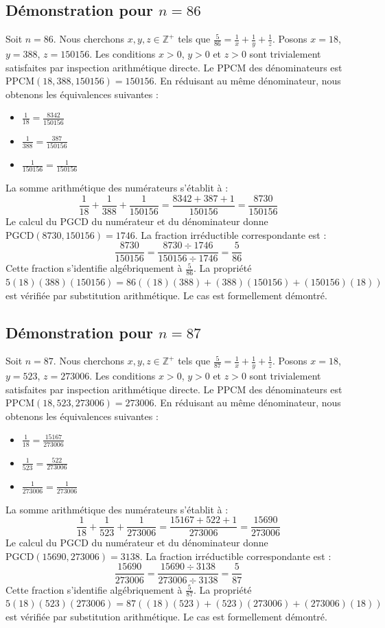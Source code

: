 \documentclass[12pt,a4paper]{article}
\begin{document}
\subsection{Démonstration pour $n = 86$}
Soit $n = 86$. Nous cherchons $x, y, z \in \mathbb{Z}^{+}$ tels que $\frac{5}{86} = \frac{1}{x} + \frac{1}{y} + \frac{1}{z}$.
Posons $x = 18$, $y = 388$, $z = 150156$.
Les conditions $x > 0$, $y > 0$ et $z > 0$ sont trivialement satisfaites par inspection arithmétique directe.
Le PPCM des dénominateurs est $\text{PPCM}(18, 388, 150156) = 150156$.
En réduisant au même dénominateur, nous obtenons les équivalences suivantes :
\begin{itemize}
    \item $\frac{1}{18} = \frac{8342}{150156}$
    \item $\frac{1}{388} = \frac{387}{150156}$
    \item $\frac{1}{150156} = \frac{1}{150156}$
\end{itemize}
La somme arithmétique des numérateurs s'établit à :
$$ \frac{1}{18} + \frac{1}{388} + \frac{1}{150156} = \frac{8342 + 387 + 1}{150156} = \frac{8730}{150156} $$
Le calcul du PGCD du numérateur et du dénominateur donne $\text{PGCD}(8730, 150156) = 1746$.
La fraction irréductible correspondante est :
$$ \frac{8730}{150156} = \frac{8730 \div 1746}{150156 \div 1746} = \frac{5}{86} $$
Cette fraction s'identifie algébriquement à $\frac{5}{86}$.
La propriété $5(18)(388)(150156) = 86((18)(388) + (388)(150156) + (150156)(18))$ est vérifiée par substitution arithmétique.
Le cas est formellement démontré.

\subsection{Démonstration pour $n = 87$}
Soit $n = 87$. Nous cherchons $x, y, z \in \mathbb{Z}^{+}$ tels que $\frac{5}{87} = \frac{1}{x} + \frac{1}{y} + \frac{1}{z}$.
Posons $x = 18$, $y = 523$, $z = 273006$.
Les conditions $x > 0$, $y > 0$ et $z > 0$ sont trivialement satisfaites par inspection arithmétique directe.
Le PPCM des dénominateurs est $\text{PPCM}(18, 523, 273006) = 273006$.
En réduisant au même dénominateur, nous obtenons les équivalences suivantes :
\begin{itemize}
    \item $\frac{1}{18} = \frac{15167}{273006}$
    \item $\frac{1}{523} = \frac{522}{273006}$
    \item $\frac{1}{273006} = \frac{1}{273006}$
\end{itemize}
La somme arithmétique des numérateurs s'établit à :
$$ \frac{1}{18} + \frac{1}{523} + \frac{1}{273006} = \frac{15167 + 522 + 1}{273006} = \frac{15690}{273006} $$
Le calcul du PGCD du numérateur et du dénominateur donne $\text{PGCD}(15690, 273006) = 3138$.
La fraction irréductible correspondante est :
$$ \frac{15690}{273006} = \frac{15690 \div 3138}{273006 \div 3138} = \frac{5}{87} $$
Cette fraction s'identifie algébriquement à $\frac{5}{87}$.
La propriété $5(18)(523)(273006) = 87((18)(523) + (523)(273006) + (273006)(18))$ est vérifiée par substitution arithmétique.
Le cas est formellement démontré.
\end{document}
